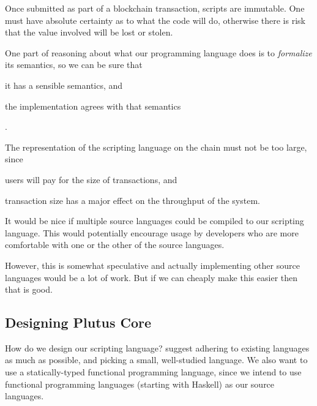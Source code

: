 \documentclass[plutus.tex]{subfiles}
\begin{document}
\begin{requirement}[Safety]
\label{req:source-lang-reasoning}
Once submitted as part of a blockchain transaction, scripts are immutable.
One must have absolute certainty as to what the code will do, otherwise there is risk that the value involved will be lost or stolen.
\end{requirement}

\begin{requirement}[Formalization]
\label{req:script-lang-formalization}
One part of reasoning about what our programming language does is to \emph{formalize} its semantics, so we can be sure that
\begin{inparaenum}
  \item it has a sensible semantics, and
  \item the implementation agrees with that semantics
\end{inparaenum}.
\end{requirement}

\begin{requirement}[Size]
\label{req:script-lang-size}
The representation of the scripting language on the chain must not be too large, since
\begin{inparaenum}
\item users will pay for the size of transactions, and
\item transaction size has a major effect on the throughput of the system.
\end{inparaenum}
\end{requirement}

\begin{requirement}
\label{req:source-lang-multiple}
It would be nice if multiple source languages could be compiled to our scripting language.
This would potentially encourage usage by developers who are more comfortable with one or the other of the source languages.

However, this is somewhat speculative and actually implementing other source languages would be a lot of work.
But if we can cheaply make this easier then that is good.
\end{requirement}

\subsection{Designing Plutus Core}

How do we design our scripting language?
 suggest adhering to existing languages as much as possible, and picking a small, well-studied language.
We also want to use a statically-typed functional programming language, since we intend to use functional programming languages (starting with Haskell) as our source languages.
\end{document}
